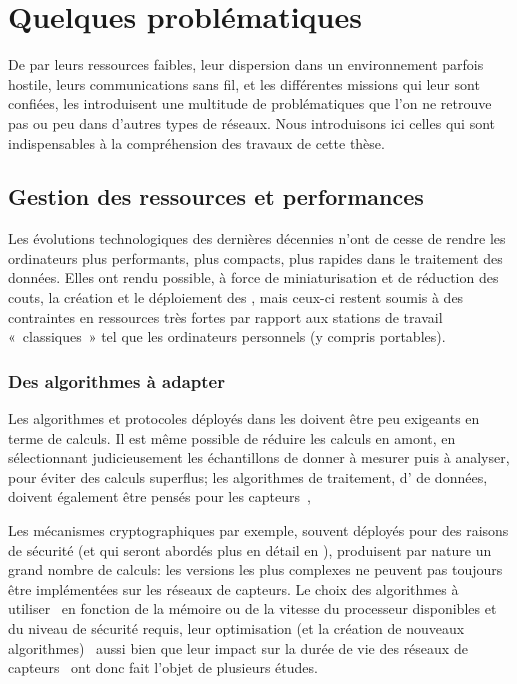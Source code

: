 \section{Quelques problématiques}

De par leurs ressources faibles, leur dispersion dans un environnement parfois hostile, leurs communications sans fil, et les différentes missions qui leur sont confiées, les \rcsfs introduisent une multitude de problématiques que l'on ne retrouve pas ou peu dans d'autres types de réseaux.
Nous introduisons ici celles qui sont indispensables à la compréhension des travaux de cette thèse.

    \subsection{Gestion des ressources et performances}
Les évolutions technologiques des dernières décennies n'ont de cesse de rendre les ordinateurs plus performants, plus compacts, plus rapides dans le traitement des données.
Elles ont rendu possible, à force de miniaturisation et de réduction des couts, la création et le déploiement des \rcsfs, mais ceux-ci restent soumis à des contraintes en ressources très fortes par rapport aux stations de travail « classiques » tel que les ordinateurs personnels (y compris portables).

        \subsubsection{Des algorithmes à adapter}
Les algorithmes et protocoles déployés dans les \rcs doivent être peu exigeants en terme de calculs.
Il est même possible de réduire les calculs en amont, en sélectionnant judicieusement les échantillons de donner à mesurer puis à analyser, pour éviter des calculs superflus; les algorithmes de traitement, d' de données, doivent également être pensés pour les capteurs~\cite{ACFP09},

Les mécanismes cryptographiques par exemple, souvent déployés pour des raisons de sécurité (et qui seront abordés plus en détail en ), produisent par nature un grand nombre de calculs: les versions les plus complexes ne peuvent pas toujours être implémentées sur les réseaux de capteurs.
Le choix des algorithmes à utiliser~\cite{LDH06} en fonction de la mémoire ou de la vitesse du processeur disponibles et du niveau de sécurité requis, leur optimisation (et la création de nouveaux algorithmes)~\cite{GNL12} aussi bien que leur impact sur la durée de vie des réseaux de capteurs~\cite{PLP06} ont donc fait l'objet de plusieurs études.

